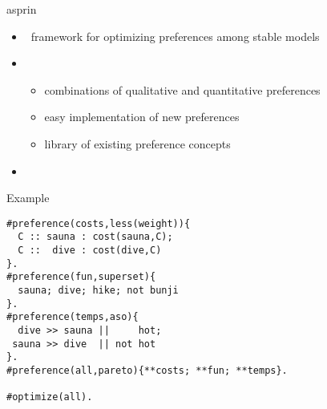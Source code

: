 \newcommand{\pf}[0]{\ensuremath{\mathit{preference}}} %
\newcommand{\name}[0]{\ensuremath{\mathit{name}}} %
\begin{frame}{asprin}
  \begin{itemize}
  \item {} \ framework for optimizing preferences among stable models
  \item {} \
    \begin{itemize}
    \item combinations of qualitative and quantitative preferences
    \item easy implementation of new preferences
    \item library of existing preference concepts
  \end{itemize}
\item {} \ \cite{brderosc15a,alrosc18a,brderosc22a}
  \end{itemize}
\end{frame}
\begin{frame}[fragile]{Example}
\begin{lstlisting}[language=clingo,basicstyle=\small\ttfamily]
#preference(costs,less(weight)){
  C :: sauna : cost(sauna,C);
  C ::  dive : cost(dive,C)
}.
#preference(fun,superset){
  sauna; dive; hike; not bunji
}.
#preference(temps,aso){
  dive >> sauna ||     hot;
 sauna >> dive  || not hot
}.
#preference(all,pareto){**costs; **fun; **temps}.

#optimize(all).
\end{lstlisting}
\end{frame}
